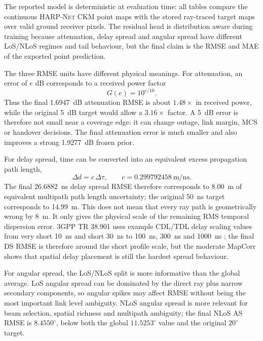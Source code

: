\documentclass[journal]{IEEEtran}
\begin{document}
The reported model is deterministic at evaluation time: all tables compare the
continuous \textsc{HARP-Net CKM} point maps with the stored ray-traced target
maps over valid ground receiver pixels. The residual head is distribution aware
during training because attenuation, delay spread and angular spread have
different LoS/NLoS regimes and tail behaviour, but the final claim is the RMSE
and MAE of the exported point prediction.

The three RMSE units have different physical meanings. For attenuation, an
error of \(e\) dB corresponds to a received power factor
\begin{equation}
  G(e)=10^{e/10}.
\end{equation}
Thus the final \SI{1.6947}{dB} attenuation RMSE is about \(1.48\times\) in
received power, while the original \SI{5}{dB} target would allow a
\(3.16\times\) factor. A \SI{5}{dB} error is therefore not small near a
coverage edge: it can change outage, link margin, MCS or handover decisions.
The final attenuation error is much smaller and also improves a strong
\SI{1.9277}{dB} frozen prior.

For delay spread, time can be converted into an equivalent excess propagation
path length,
\begin{equation}
  \Delta d = c\,\Delta\tau,\qquad c=0.299792458~\mathrm{m/ns}.
\end{equation}
The final \SI{26.6882}{ns} delay spread RMSE therefore corresponds to
\SI{8.00}{m} of equivalent multipath path length uncertainty; the original
\SI{50}{ns} target corresponds to \SI{14.99}{m}. This does not mean that every
ray path is geometrically wrong by \SI{8}{m}. It only gives the physical scale
of the remaining RMS temporal dispersion error. 3GPP TR 38.901 uses example
CDL/TDL delay scaling values from very short \SI{10}{ns} and short
\SI{30}{ns} to \SI{100}{ns}, \SI{300}{ns} and \SI{1000}{ns}
\cite{tr38901}; the final DS RMSE is therefore around the short profile scale,
but the moderate MapCorr shows that spatial delay placement is still the
hardest spread behaviour.

For angular spread, the LoS/NLoS split is more informative than the global
average. LoS angular spread can be dominated by the direct ray plus narrow
secondary components, so angular spikes may affect RMSE without being the most
important link level ambiguity. NLoS angular spread is more relevant for
beam selection, spatial richness and multipath ambiguity; the final NLoS AS
RMSE is \(8.4550^\circ\), below both the global \(11.5253^\circ\) value and
the original \(20^\circ\) target.
\end{document}
